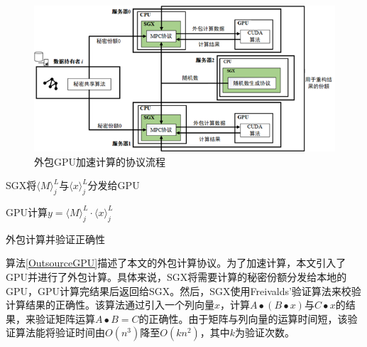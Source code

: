 \begin{figure}[h]
	\centering
	\includegraphics[width=0.9\linewidth]{figures/Chap4_With_GPU.png}
	\caption{外包GPU加速计算的协议流程}
	\label{Chap4_With_GPU}
\end{figure}

\begin{algorithm}[H]
	\SetAlgoLined
	
	
	SGX将$\langle M\rangle_j^L$与$\langle x\rangle_j^L$分发给GPU
	
	GPU计算$y = \langle M\rangle_j^L\cdot \langle x\rangle_j^L$
	
	\label{OutsourceGPU}
	\caption{外包计算并验证正确性}
\end{algorithm}


算法\ref{OutsourceGPU}描述了本文的外包计算协议。为了加速计算，本文引入了GPU并进行了外包计算。具体来说，SGX将需要计算的秘密份额分发给本地的GPU，GPU计算完结果后返回给SGX。然后，SGX使用Freivalds'验证算法\cite{Random_Algorithm}来校验计算结果的正确性。该算法通过引入一个列向量$x$，计算$A∙(B∙x)$与$C∙x$的结果，来验证矩阵运算$A∙B=C$的正确性。由于矩阵与列向量的运算时间短，该验证算法能将验证时间由$O(n^3)$降至$O(kn^2)$，其中$k$为验证次数。

